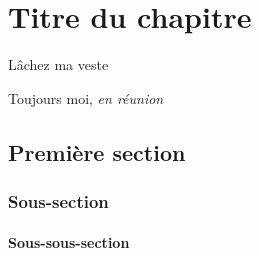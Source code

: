 \graphicspath{{chapter2/figures/}}

\chapter{Titre du chapitre}

\epigraph{Lâchez ma veste}{Toujours moi, \textit{en réunion}}

\section{Première section}

\subsection{Sous-section}

\subsubsection{Sous-sous-section}

